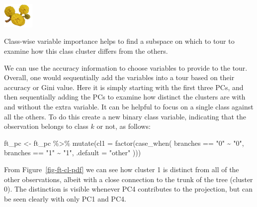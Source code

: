 \documentclass[
  letterpaper,
]{krantz}
\newenvironment{Shaded}{\begin{snugshade}}{\end{snugshade}}
\newcommand{\AttributeTok}[1]{\textcolor[rgb]{0.40,0.45,0.13}{#1}}
\newcommand{\FunctionTok}[1]{\textcolor[rgb]{0.28,0.35,0.67}{#1}}
\newcommand{\NormalTok}[1]{\textcolor[rgb]{0.00,0.23,0.31}{#1}}
\newcommand{\OtherTok}[1]{\textcolor[rgb]{0.00,0.23,0.31}{#1}}
\newcommand{\SpecialCharTok}[1]{\textcolor[rgb]{0.37,0.37,0.37}{#1}}
\newcommand{\StringTok}[1]{\textcolor[rgb]{0.13,0.47,0.30}{#1}}
\newcommand{\infobox}[1]{%
\noindent\colorbox{info!30}{%
\begin{minipage}{0.98\linewidth}%
    \centering%
    \begin{minipage}[c]{0.15\linewidth} %
      \includegraphics[width=1.5cm]{images/mulga-flowers2.png} %
    \end{minipage}%
    \hfill %
    \begin{minipage}[c]{0.8\linewidth} %
      \bigskip%
      \textsf{#1}%
      \bigskip%
    \end{minipage}%
    \hspace*{3mm}%
  \end{minipage}%
}%
}
\begin{document}
\infobox{Class-wise variable importance helps to find a subspace on which to tour to examine how this class cluster differs from the others.}

We can use the accuracy information to choose variables to provide to
the tour. Overall, one would sequentially add the variables into a tour
based on their accuracy or Gini value. Here it is simply starting with
the first three PCs, and then sequentially adding the PCs to examine how
distinct the clusters are with and without the extra variable. It can be
helpful to focus on a single class against all the others. To do this
create a new binary class variable, indicating that the observation
belongs to class \(k\) or not, as follows:

\begin{Shaded}
\begin{Highlighting}[]
\NormalTok{ft\_pc }\OtherTok{\textless{}{-}}\NormalTok{ ft\_pc }\SpecialCharTok{\%\textgreater{}\%}
  \FunctionTok{mutate}\NormalTok{(}\AttributeTok{cl1 =} \FunctionTok{factor}\NormalTok{(}\FunctionTok{case\_when}\NormalTok{(}
\NormalTok{                 branches }\SpecialCharTok{==} \StringTok{"0"} \SpecialCharTok{\textasciitilde{}} \StringTok{"0"}\NormalTok{,}
\NormalTok{                 branches }\SpecialCharTok{==} \StringTok{"1"} \SpecialCharTok{\textasciitilde{}} \StringTok{"1"}\NormalTok{,}
                 \AttributeTok{.default =} \StringTok{"other"}
\NormalTok{  )))}
\end{Highlighting}
\end{Shaded}

From Figure~\ref{fig-ft-cl-pdf} we can see how cluster 1 is distinct
from all of the other observations, albeit with a close connection to
the trunk of the tree (cluster 0). The distinction is visible whenever
PC4 contributes to the projection, but can be seen clearly with only PC1
and PC4.
\end{document}
